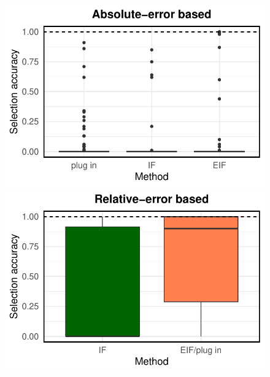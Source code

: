 \documentclass{article}
\theoremstyle{plain}
\theoremstyle{definition}
\theoremstyle{plain}
\begin{document}
\begin{figure}[h]
        \centering
        \begin{minipage}{0.3\textwidth}
                \centering
                \includegraphics[clip, trim = 0cm 0cm 0cm 0cm, width = \textwidth]{plot/ACIC_linear_propensity_linear_HTE_selection_accuracy_absolute_error.pdf}
        \end{minipage}
            \begin{minipage}{0.3\textwidth}
                \centering
                \includegraphics[clip, trim = 0cm 0cm 0cm 0cm, width = \textwidth]{plot/ACIC_linear_propensity_linear_HTE_selection_accuracy_relative_error.pdf}
        \end{minipage}
                \begin{minipage}{0.3\textwidth}

\end{minipage}
\end{figure}
\end{document}
